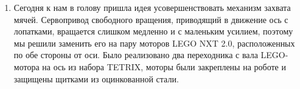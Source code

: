 \begin{enumerate}
\begin{enumerate}
        \item Сегодня к нам в голову пришла идея усовершенствовать механизм захвата мячей. Сервопривод свободного вращения, приводящий в движение ось с лопатками, вращается слишком медленно и с маленьким усилием, поэтому мы решили заменить его на пару моторов LEGO NXT 2.0, расположенных по обе стороны от оси. Было реализовано два переходника с вала LEGO-мотора на ось из набора TETRIX, моторы были закреплены на роботе и защищены щитками из оцинкованной стали.
        \begin{figure}[H]
	  	  \begin{minipage}[h]{0.47\linewidth}
	  	  \end{minipage}
	  	  \hfill
	  	  \begin{minipage}[h]{0.24\linewidth}

\end{minipage}
\end{figure}
\end{enumerate}
\end{enumerate}
